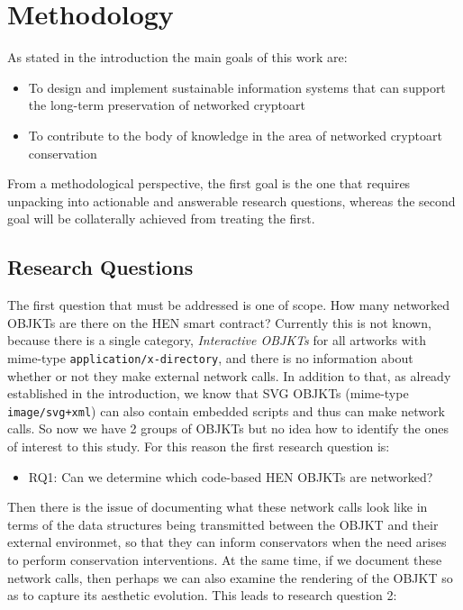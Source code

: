 \chapter{Methodology}

As stated in the introduction the main goals of this work are:

\begin{itemize}
	\item To design and implement sustainable information systems that can support the long-term preservation of networked cryptoart
	\item To contribute to the body of knowledge in the area of networked cryptoart conservation
\end{itemize}

From a methodological perspective, the first goal is the one that requires unpacking into actionable and answerable research questions, whereas the second goal will be collaterally achieved from treating the first.

\section{Research Questions}

The first question that must be addressed is one of scope. How many networked OBJKTs are there on the HEN smart contract? Currently this is not known, because there is a single category, \emph{Interactive OBJKTs} for all artworks with mime-type \texttt{application/x-directory}, and there is no information about whether or not they make external network calls. In addition to that, as already established in the introduction, we know that SVG OBJKTs (mime-type \texttt{image/svg+xml}) can also contain embedded scripts and thus can make network calls. So now we have 2 groups of OBJKTs but no idea how to identify the ones of interest to this study. For this reason the first research question is:

\begin{itemize}
	\item RQ1: Can we determine which code-based HEN OBJKTs are networked?
\end{itemize}

Then there is the issue of documenting what these network calls look like in terms of the data structures being transmitted between the OBJKT and their external environmet, so that they can inform conservators when the need arises to perform conservation interventions. At the same time, if we document these network calls, then perhaps we can also examine the rendering of the OBJKT so as to capture its aesthetic evolution. This leads to research question 2:

